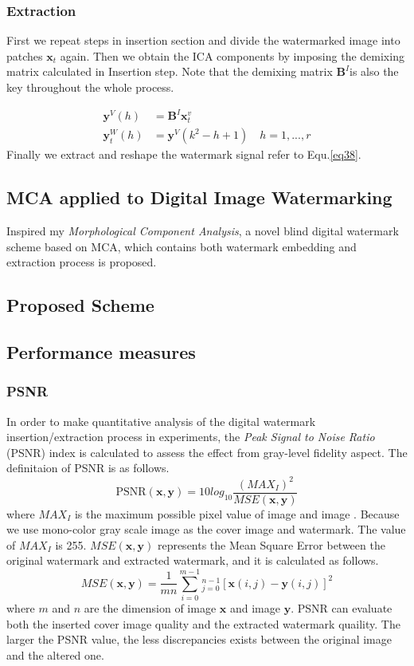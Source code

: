 \subsubsection{Extraction}
First we repeat steps in insertion section and divide the watermarked image into patches $\mathbf{x}_t$ again. Then we obtain the ICA components by imposing the demixing matrix calculated in Insertion step. Note that the demixing matrix $\mathbf{B}^I$is also the key throughout the whole process.

\begin{align}
    \mathbf{y}^V(h)  &=  \mathbf{B}^I\mathbf{x}_t^v \\
    \mathbf{y}_t^W(h) &= \mathbf{y}^V(k^2-h+1) \quad h = 1,...,r
    \label{eq38}
\end{align}
Finally we extract and reshape the watermark signal refer to Equ.\ref{eq38}. 

\subsection{MCA applied to Digital Image Watermarking}
Inspired my \textit{Morphological Component Analysis}, a novel blind digital watermark scheme based on MCA, which contains both watermark embedding and extraction process is proposed.

\subsection{Proposed Scheme}


\subsection{Performance measures}
\subsubsection{PSNR}
In order to make quantitative analysis of the digital watermark insertion/extraction process in experiments, the\textit{ Peak Signal to Noise Ratio} (PSNR) index is calculated to assess the effect from gray-level fidelity aspect. The definitaion of PSNR is as follows.
\begin{equation}
    \text{PSNR}(\mathbf{x,y}) = 10log_{10}\frac{(MAX_I)^2}{MSE(\mathbf{x,y})} 
\end{equation}
where $MAX_I$ is the maximum possible pixel value of image  and image . Because we use mono-color gray scale image as the cover image and watermark. The value of $MAX_I$ is 255. $MSE(\mathbf{x,y})$ represents the Mean Square Error between the original watermark and extracted watermark, and it is calculated as follows.
\begin{equation}
    MSE(\mathbf{x,y}) =  \frac{1}{mn}\sum_{i=0}^{m-1}_{j=0}^{n-1}[\mathbf{x}(i,j) - \mathbf{y}(i,j)]^2
\end{equation}
where $m$ and $n$ are the dimension of image $\mathbf{x}$ and image $\mathbf{y}$. PSNR can evaluate both the inserted cover image quality and the extracted watermark quaility. The larger the PSNR value, the less discrepancies exists between the original image and the altered one.

